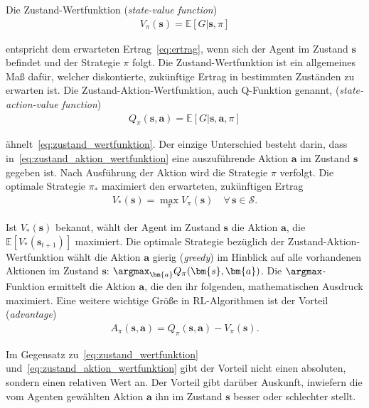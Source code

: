 Die Zustand-Wertfunktion (\textit{state-value function})
\begin{align}
V_\pi(\bm{s}) = \mathds{E}[G|\bm{s},\pi]
\label{eq:zustand_wertfunktion}
\end{align}

entspricht dem erwarteten Ertrag~\eqref{eq:ertrag}, wenn sich der Agent im Zustand $\bm{s}$ befindet und der Strategie $\pi$ folgt. Die Zustand-Wertfunktion ist ein allgemeines Maß dafür, welcher diskontierte, zukünftige Ertrag in bestimmten Zuständen zu erwarten ist. 
Die Zustand-Aktion-Wertfunktion, auch Q-Funktion genannt, (\textit{state-action-value function}) 
\begin{align}
Q_\pi (\bm{s}, \bm{a}) = \mathds{E}[G|\bm{s},\bm{a},\pi]
\label{eq:zustand_aktion_wertfunktion}
\end{align}

ähnelt~\eqref{eq:zustand_wertfunktion}. Der einzige Unterschied besteht darin, dass in~\eqref{eq:zustand_aktion_wertfunktion} eine auszuführende Aktion $\bm{a}$ im Zustand $\bm{s}$ gegeben ist. Nach Ausführung der Aktion wird die Strategie $\pi$ verfolgt.
Die optimale Strategie $\pi_*$ maximiert den erwarteten, zukünftigen Ertrag
\begin{align}
V_*	(\bm{s}) = \max\limits_{\pi} V_\pi (\bm{s}) \quad \forall \, \bm{s} \in \mathcal{S}.
\label{eq:v_optimal}
\end{align}

Ist $V_*(\bm{s})$ bekannt, wählt der Agent im Zustand $\bm{s}$ die Aktion $\bm{a}$, die $\mathds{E}[V_*(\bm{s}_{t+1})]$ maximiert.  Die optimale Strategie bezüglich der Zustand-Aktion-Wertfunktion wählt die Aktion $\bm{a}$ gierig (\textit{greedy}) im Hinblick auf alle vorhandenen Aktionen im Zustand $\bm{s}$:
$\argmax_{\bm{a}} Q_\pi (\bm{s}, \bm{a})$. Die $\argmax$-Funktion ermittelt die Aktion $\bm{a}$, die den ihr folgenden, mathematischen Ausdruck maximiert. Eine weitere wichtige Größe in RL-Algorithmen ist der Vorteil (\textit{advantage})
\begin{align}
A_\pi (\bm{s},\bm{a}) = Q_\pi(\bm{s}, \bm{a}) - V_\pi (\bm{s}). 
\label{eq:vorteil}
\end{align}

Im Gegensatz zu~\eqref{eq:zustand_wertfunktion} und~\eqref{eq:zustand_aktion_wertfunktion} gibt der Vorteil nicht einen absoluten, sondern einen relativen Wert an. Der Vorteil gibt darüber Auskunft, inwiefern die vom Agenten gewählten Aktion $\bm{a}$ ihn im Zustand $\bm{s}$ besser oder schlechter stellt. 

